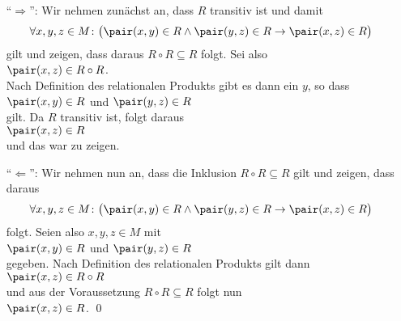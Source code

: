 \proof
\begin{enumerate}
\item[``$\Rightarrow$'':] 
      Wir nehmen zun\"{a}chst an, dass $R$ transitiv ist und damit
      \[ \forall x, y, z \in M \colon \bigl(\pair(x,y) \in R \wedge \pair(y,z) \in R \rightarrow \pair(x,z) \in R\bigr) \]
      gilt und zeigen, dass daraus $R \circ R \subseteq R$ folgt.
      Sei also
      \\[0.2cm]
      \hspace*{1.3cm}
      $\pair(x,z) \in R \circ R$.  
      \\[0.2cm]
      Nach Definition des relationalen Produkts gibt es
      dann ein $y$, so dass
      \\[0.2cm]
      \hspace*{1.3cm}
      $\pair(x,y) \in R$ und $\pair(y,z) \in R$ 
      \\[0.2cm]
      gilt. Da $R$ transitiv ist, folgt daraus
      \\[0.2cm]
      \hspace*{1.3cm}
      $\pair(x,z) \in R$ 
      \\[0.2cm] 
      und das war zu zeigen.
\item[``$\Leftarrow$'':]
      Wir nehmen nun an, dass die Inklusion $R \circ R \subseteq R$ gilt und zeigen, dass daraus
      \[ \forall x, y, z \in M \colon \bigl(\pair(x,y) \in R \wedge \pair(y,z) \in R \rightarrow \pair(x,z) \in R\bigr) \]
      folgt.  Seien also $x,y,z \in M$ mit
      \\[0.2cm]
      \hspace*{1.3cm}
      $\pair(x,y) \in R$ und $\pair(y,z) \in R$ 
      \\[0.2cm]
      gegeben.  Nach Definition des relationalen Produkts gilt dann
      \\[0.2cm]
      \hspace*{1.3cm}
      $\pair(x,z) \in R \circ R$ 
      \\[0.2cm]
      und aus
      der Voraussetzung $R \circ R \subseteq R$ folgt nun
      \\[0.2cm]
      \hspace*{1.3cm}
      $\pair(x,z) \in R$. 
      \qed
\end{enumerate} 

